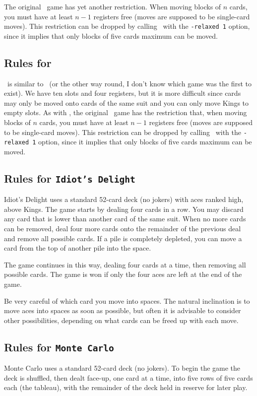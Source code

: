 The original \freecell\ game has yet
another restriction. When moving blocks of $n$ cards, you must have at least
$n-1$ registers free (moves are supposed to be single-card moves). This
restriction can be dropped by calling \xpat\ with the {\tt -relaxed 1} option,
since it implies that only blocks of five cards maximum can be moved.

\subsection{Rules for \seahaven}
\seahaven\ is similar to \freecell\ (or the other way round, I don't know which
game was the first to exist). We have ten slots and four registers, but it is
more difficult since cards may only be moved onto cards of the same suit and
you can only move Kings to empty slots.
As with \freecell, the original \seahaven\ game has
the restriction that, when moving blocks of $n$ cards, you must have at least
$n-1$ registers free (moves are supposed to be single-card moves). This
restriction can be dropped by calling \xpat\ with the {\tt -relaxed 1} option,
since it implies that only blocks of five cards maximum can be moved.

\subsection{Rules for {\tt Idiot's Delight}}
Idiot's Delight uses a standard 52-card deck (no
jokers) with aces ranked high, above Kings.  The game
starts by dealing four cards in a row.  You may
discard any card that is lower than another card of
the same suit.  When no more cards can be removed,
deal four more cards onto the remainder of the
previous deal and remove all possible cards.  If a
pile is completely depleted, you can move a card from
the top of another pile into the space.

The game continues in this way, dealing four cards at
a time, then removing all possible cards.  The game is
won if only the four aces are left at the end of the
game.

Be very careful of which card you move into spaces.
The natural inclination is to move aces into spaces as
soon as possible, but often it is advisable to
consider other possibilities, depending on what cards
can be freed up with each move.


\subsection{Rules for {\tt Monte Carlo}}
Monte Carlo uses a standard 52-card deck (no jokers).
To begin the game the deck is shuffled, then dealt
face-up, one card at a time, into five rows of five
cards each (the tableau), with the remainder of the
deck held in reserve for later play.

